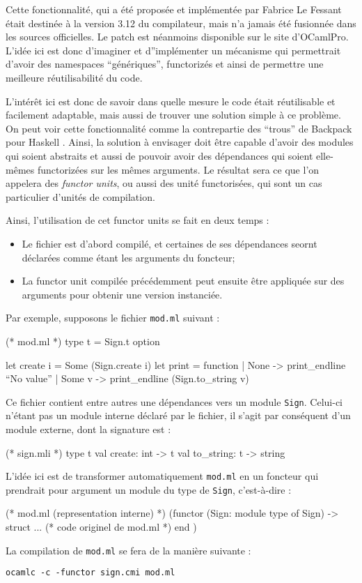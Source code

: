 \documentclass[11pt,a4paper]{report}
\begin{document}
Cette fonctionnalité, qui a été proposée et implémentée par Fabrice Le Fessant
\cite{lefessant-bigfunctors} était destinée à la version 3.12 du compilateur,
mais n'a jamais été fusionnée dans les sources officielles. Le patch est
néanmoins disponible sur le site d'OCamlPro. L'idée ici est donc d'imaginer et
d''implémenter un mécanisme qui permettrait d'avoir des namespaces
``génériques'', functorizés et ainsi de permettre une meilleure réutilisabilité
du code.

L'intérêt ici est donc de savoir dans quelle mesure le code était réutilisable
et facilement adaptable, mais aussi de trouver une solution simple à ce
problème. On peut voir cette fonctionnalité comme la contrepartie des ``trous''
de Backpack pour Haskell \cite{KilpatrickDJM14}. Ainsi, la solution à envisager
doit être capable d'avoir des modules qui soient abstraits et aussi de pouvoir
avoir des dépendances qui soient elle-mêmes functorizées sur les mêmes
arguments. Le résultat sera ce que l'on appelera des \emph{functor units}, ou
aussi des unité functorisées, qui sont un cas particulier d'unités de
compilation.

Ainsi, l'utilisation de cet functor units se fait en deux temps :
\begin{itemize}
\item Le fichier est d'abord compilé, et certaines de ses dépendances seornt
  déclarées comme étant les arguments du foncteur;
\item La functor unit compilée précédemment peut ensuite être appliquée sur des
  arguments pour obtenir une version instanciée.
\end{itemize}

Par exemple, supposons le fichier \texttt{mod.ml} suivant :
\begin{OCaml}
(* mod.ml *)
type t = Sign.t option

let create i = Some (Sign.create i)
let print = function
  | None -> print_endline ``No value''
  | Some v -> print_endline (Sign.to_string v)
\end{OCaml}

Ce fichier contient entre autres une dépendances vers un module
\texttt{Sign}. Celui-ci n'étant pas un module interne déclaré par le fichier, il
s'agit par conséquent d'un module externe, dont la signature est :
\begin{OCaml}
(* sign.mli *)
type t
val create: int -> t
val to_string: t -> string
\end{OCaml}

L'idée ici est de transformer automatiquement \texttt{mod.ml} en un foncteur qui
prendrait pour argument un module du type de \texttt{Sign}, c'est-à-dire :
\begin{OCaml}
(* mod.ml (representation interne) *)
(functor (Sign: module type of Sign) ->
  struct 
   ... (* code originel de mod.ml *)
  end
) 
\end{OCaml}
La compilation de \texttt{mod.ml} se fera de la manière suivante :
\begin{verbatim}
ocamlc -c -functor sign.cmi mod.ml
\end{verbatim}
\end{document}

